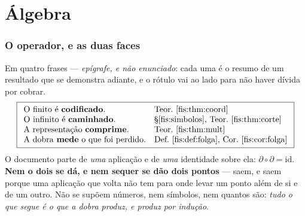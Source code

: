 \documentclass[livro.tex]{subfiles}
\begin{document}
\part{Álgebra}

\section{O operador, e as duas faces}\label{fis:dobra}

\noindent Em quatro frases --- \emph{epígrafe, e não enunciado}: cada uma é o
resumo de um resultado que se demonstra adiante, e o rótulo vai ao lado para não
haver dívida por cobrar.
\[
\boxed{
\begin{array}{ll}
\text{O finito é \textbf{codificado}.} & \text{Teor.~\ref{fis:thm:coord}}\\
\text{O infinito é \textbf{caminhado}.} & \text{§\ref{fis:simbolos}, Teor.~\ref{fis:thm:corte}}\\
\text{A representação \textbf{comprime}.} & \text{Teor.~\ref{fis:thm:mult}}\\
\text{A dobra \textbf{mede} o que foi perdido.} & \text{Def.~\ref{fis:def:folga}, Cor.~\ref{fis:cor:folga}}
\end{array}}
\]
\medskip\noindent O documento parte de \emph{uma} aplicação e de \emph{uma}
identidade sobre ela: $\partial\circ\partial=\mathrm{id}$. \textbf{Nem o dois se
dá, e nem sequer se dão dois pontos} --- saem, e saem porque uma aplicação que
volta não tem para onde levar um ponto além de si e de um outro. Não se supõem números,
nem símbolos, nem quantos são: \emph{tudo o que segue é o que a dobra produz, e
produz por indução}.
\end{document}
